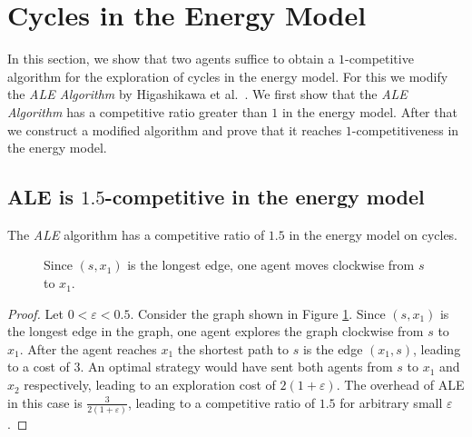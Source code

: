 \section{Cycles in the Energy Model} \label{cycles}

In this section, we show that two agents suffice to obtain a $1$-competitive algorithm for the exploration
of cycles in the energy model. For this we modify the \textit{ALE Algorithm} by Higashikawa et al.\ \cite{Higashikawa2012}. We first show 
that the \textit{ALE Algorithm} has a competitive ratio greater than $1$ in the energy model. After that we construct a modified
algorithm and prove that it reaches $1$-competitiveness in the energy model.

\subsection{ALE is $1.5$-competitive in the energy model}


\begin{theorem}\label{AleLowerTad}
    The \textit{ALE} algorithm has a competitive ratio of $1.5$ in the energy model on cycles.
\end{theorem}


\begin{figure}[H]
    \begin{center}
    \end{center}
    \caption[ALE is not $1$-competitive]{Since $(s,x_1)$ is the longest edge, one agent moves clockwise from $s$ to $x_1$.}\label{ale}
\end{figure}

\begin{proof}
    Let $0 < \varepsilon < 0.5$. Consider the graph shown in Figure \ref{ale}. Since $(s,x_1)$ is the longest edge in the graph, one agent explores the graph clockwise from $s$ to $x_1$. After the agent
    reaches $x_1$ the shortest path to $s$ is the edge $(x_1, s)$, leading to a cost of $3$. An optimal strategy would have sent both agents from $s$ to $x_1$ 
    and $x_2$ respectively, leading to an exploration cost of $2(1+\varepsilon)$. The overhead of ALE in this case is $\frac{3}{2(1+\varepsilon)}$, leading to a competitive ratio of
    $1.5$ for arbitrary small $\varepsilon$.
\end{proof}

